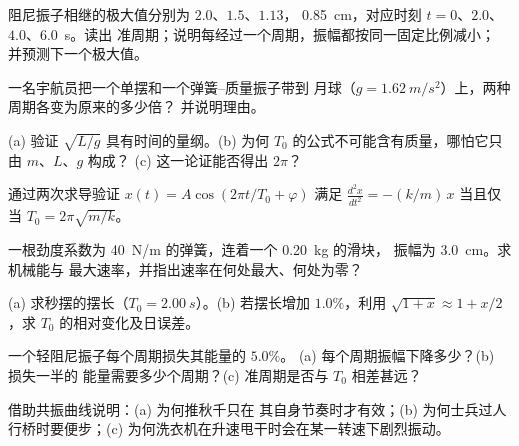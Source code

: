 \begin{exercise}[$\star$]\label{exo:g12:oscillators-and-time:4}
阻尼振子相继的极大值分别为 $2.0$、$1.5$、$1.13$，
\qty{0.85}{cm}，对应时刻 $t = 0$、$2.0$、$4.0$、\qty{6.0}{s}。读出
准周期；说明每经过一个周期，振幅都按同一固定比例减小；
并预测下一个极大值。
\end{exercise}

\begin{exercise}[$\star$]\label{exo:g12:oscillators-and-time:5}
一名宇航员把一个单摆和一个弹簧–质量振子带到
月球（$g = \qty{1.62}{m/s^2}$）上，两种周期各变为原来的多少倍？
并说明理由。
\end{exercise}

\begin{exercise}[$\star\star$]\label{exo:g12:oscillators-and-time:6}
(a) 验证 $\sqrt{L/g}$ 具有时间的量纲。(b)
为何 $T_0$ 的公式不可能含有质量，哪怕它只由 $m$、$L$、$g$ 构成？
(c) 这一论证能否得出 $2\pi$？
\end{exercise}

\begin{exercise}[$\star\star$]\label{exo:g12:oscillators-and-time:7}
通过两次求导验证 $x(t) = A\cos(2\pi t/T_0 +
\varphi)$ 满足 $\frac{d^2x}{dt^2} = -(k/m)\,x$ 当且仅当
$T_0 = 2\pi\sqrt{m/k}$。
\end{exercise}

\begin{exercise}[$\star\star$]\label{exo:g12:oscillators-and-time:8}
一根劲度系数为 \qty{40}{N/m} 的弹簧，连着一个 \qty{0.20}{kg} 的滑块，
振幅为 \qty{3.0}{cm}。求机械能与
最大速率，并指出速率在何处最大、何处为零？
\end{exercise}

\begin{exercise}[$\star\star$]\label{exo:g12:oscillators-and-time:9}
(a) 求秒摆的摆长（$T_0 =
\qty{2.00}{s}$）。(b) 若摆长增加 $1.0\%$，利用 $\sqrt{1+x}
\approx 1 + x/2$，求 $T_0$ 的相对变化及日误差。
\end{exercise}

\begin{exercise}[$\star\star$]\label{exo:g12:oscillators-and-time:10}
一个轻阻尼振子每个周期损失其能量的 $5.0\%$。
(a) 每个周期振幅下降多少？(b) 损失一半的
能量需要多少个周期？(c) 准周期是否与 $T_0$ 相差甚远？
\end{exercise}

\begin{exercise}[$\star\star$]\label{exo:g12:oscillators-and-time:11}
借助共振曲线说明：(a) 为何推秋千只在
其自身节奏时才有效；(b) 为何士兵过人行桥时要便步；(c)
为何洗衣机在升速甩干时会在某一转速下剧烈振动。
\end{exercise}

